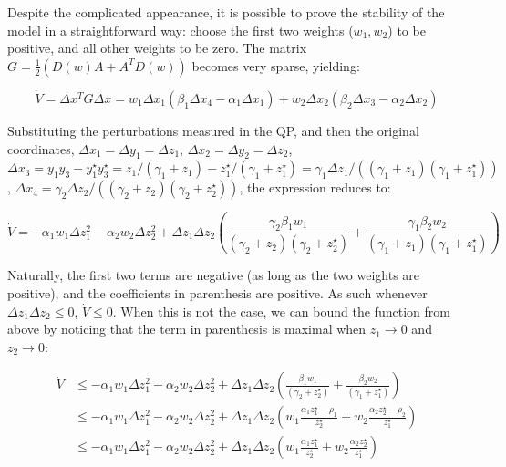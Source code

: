 \documentclass{article}
\begin{document}
Despite the complicated appearance, it is possible to prove the
stability of the model in a straightforward way: choose the first two
weights (\(w_1, w_2\)) to be positive, and all other weights to be zero.
The matrix \(G = \frac{1}{2}(D(w)A + A^T D(w))\) becomes very sparse,
yielding:

\begin{equation}
\dot{V} = \Delta x^T G \Delta x = w_1 \Delta x_1 (\beta_1 \Delta x_4 - \alpha_1 \Delta x_1) + w_2 \Delta x_2 (\beta_2 \Delta x_3 - \alpha_2 \Delta x_2)
\end{equation}

Substituting the perturbations measured in the QP, and then the original
coordinates, \(\Delta x_1 = \Delta y_1 = \Delta z_1\),
\(\Delta x_2 = \Delta y_2 = \Delta z_2\),
\(\Delta x_3 = y_1 y_3 - y_1^\star y_3^\star = z_1 / (\gamma_1 + z_1) - z_1^\star / (\gamma_1 + z_1^\star) = \gamma_1 \Delta z_1 / ((\gamma_1 + z_1) (\gamma_1 + z_1^\star))\),
\(\Delta x_4 = \gamma_2 \Delta z_2 / ((\gamma_2 + z_2) (\gamma_2 + z_2^\star))\),
the expression reduces to:

\begin{equation}
\dot{V} = - \alpha_1 w_1 \Delta z_1^2 - \alpha_2 w_2 \Delta z_2^2 + \Delta z_1 \Delta z_2 \left(\frac{\gamma_2 \beta_1 w_1}{(\gamma_2 +z_2)(\gamma_2 +z_2^\star)} + \frac{\gamma_1 \beta_2 w_2}{(\gamma_1 +z_1)(\gamma_1 +z_1^\star)} \right)
\end{equation}

Naturally, the first two terms are negative (as long as the two weights
are positive), and the coefficients in parenthesis are positive. As such
whenever \(\Delta z_1 \Delta z_2 \leq 0\), \(\dot{V} \leq 0\). When this
is not the case, we can bound the function from above by noticing that
the term in parenthesis is maximal when \(z_1 \to 0\) and \(z_2 \to 0\):

\begin{equation}
\begin{aligned}
\dot{V} &\leq - \alpha_1 w_1 \Delta z_1^2 - \alpha_2 w_2 \Delta z_2^2 + \Delta z_1 \Delta z_2 \left(\frac{\beta_1 w_1}{(\gamma_2 +z_2^\star)} + \frac{\beta_2 w_2}{(\gamma_1 +z_1^\star)} \right)\\
&\leq - \alpha_1 w_1 \Delta z_1^2 - \alpha_2 w_2 \Delta z_2^2 + \Delta z_1 \Delta z_2 \left(w_1 \frac{\alpha_1 z_1^\star - \rho_1}{z_2^\star} + w_2 \frac{\alpha_2 z_2^\star- \rho_2}{z_1^\star} \right)\\
&\leq - \alpha_1 w_1 \Delta z_1^2 - \alpha_2 w_2 \Delta z_2^2 + \Delta z_1 \Delta z_2 \left(w_1 \frac{\alpha_1 z_1^\star}{z_2^\star} + w_2\frac{\alpha_2 z_2^\star}{z_1^\star} \right)
\end{aligned}
\end{equation}
\end{document}
